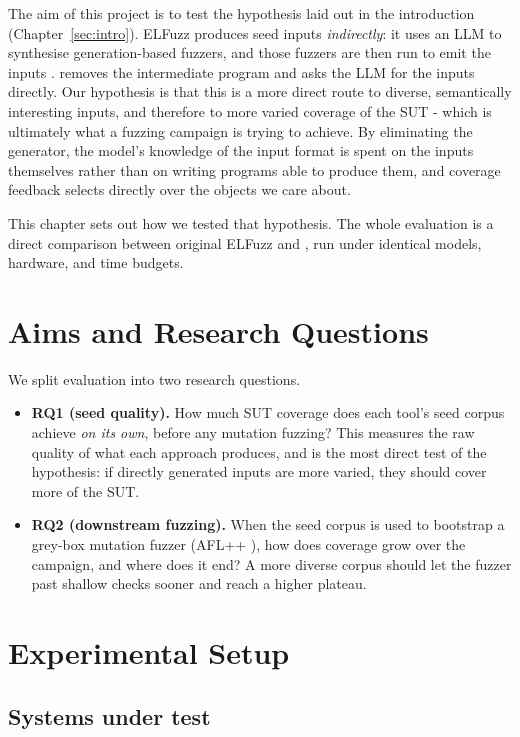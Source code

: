 The aim of this project is to test the hypothesis laid out in the introduction (Chapter~\ref{sec:intro}). ELFuzz produces seed inputs \textit{indirectly}: it uses an LLM to synthesise generation-based fuzzers, and those fuzzers are then run to emit the inputs \cite{chen_2025_elfuzz}. \toolname{} removes the intermediate program and asks the LLM for the inputs directly. Our hypothesis is that this is a more direct route to diverse, semantically interesting inputs, and therefore to more varied coverage of the SUT - which is ultimately what a fuzzing campaign is trying to achieve. By eliminating the generator, the model's knowledge of the input format is spent on the inputs themselves rather than on writing programs able to produce them, and coverage feedback selects directly over the objects we care about.

This chapter sets out how we tested that hypothesis. The whole evaluation is a direct comparison between original ELFuzz and \toolname{}, run under identical models, hardware, and time budgets.

\section{Aims and Research Questions}
\label{sec:eval-rqs}

We split evaluation into two research questions.

\begin{itemize}
    \item \textbf{RQ1 (seed quality).} How much SUT coverage does each tool's seed corpus achieve \textit{on its own}, before any mutation fuzzing? This measures the raw quality of what each approach produces, and is the most direct test of the hypothesis: if directly generated inputs are more varied, they should cover more of the SUT.
    \item \textbf{RQ2 (downstream fuzzing).} When the seed corpus is used to bootstrap a grey-box mutation fuzzer (AFL++ \cite{fioraldi_2020_aflplusplus}), how does coverage grow over the campaign, and where does it end? A more diverse corpus should let the fuzzer past shallow checks sooner and reach a higher plateau.
\end{itemize}

\section{Experimental Setup}
\label{sec:eval-setup}

\subsection{Systems under test}

